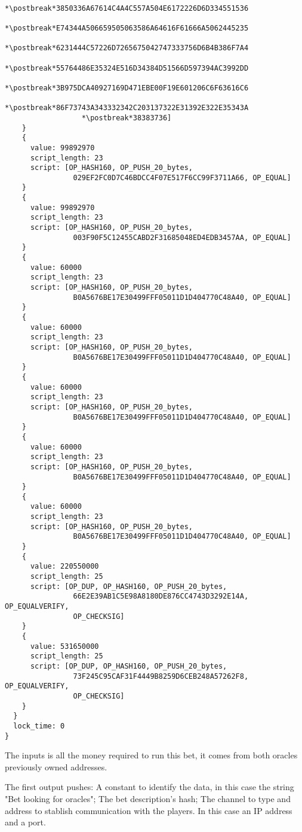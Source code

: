\begin{lstlisting}
                  *\postbreak*3850336A67614C4A4C557A504E6172226D6D334551536
                  *\postbreak*E74344A506659505063586A64616F61666A5062445235
                  *\postbreak*6231444C57226D7265675042747333756D6B4B386F7A4
                  *\postbreak*55764486E35324E516D34384D51566D597394AC3992DD
                  *\postbreak*3B975DCA40927169D471EBE00F19E601206C6F63616C6
                  *\postbreak*86F73743A343332342C203137322E31392E322E35343A
                  *\postbreak*38383736]
    }
    {
      value: 99892970
      script_length: 23
      script: [OP_HASH160, OP_PUSH_20_bytes,
                029EF2FC0D7C46BDCC4F07E517F6CC99F3711A66, OP_EQUAL]
    }
    {
      value: 99892970
      script_length: 23
      script: [OP_HASH160, OP_PUSH_20_bytes,
                003F90F5C12455CABD2F31685048ED4EDB3457AA, OP_EQUAL]
    }
    {
      value: 60000
      script_length: 23
      script: [OP_HASH160, OP_PUSH_20_bytes,
                B0A5676BE17E30499FFF05011D1D404770C48A40, OP_EQUAL]
    }
    {
      value: 60000
      script_length: 23
      script: [OP_HASH160, OP_PUSH_20_bytes,
                B0A5676BE17E30499FFF05011D1D404770C48A40, OP_EQUAL]
    }
    {
      value: 60000
      script_length: 23
      script: [OP_HASH160, OP_PUSH_20_bytes,
                B0A5676BE17E30499FFF05011D1D404770C48A40, OP_EQUAL]
    }
    {
      value: 60000
      script_length: 23
      script: [OP_HASH160, OP_PUSH_20_bytes,
                B0A5676BE17E30499FFF05011D1D404770C48A40, OP_EQUAL]
    }
    {
      value: 60000
      script_length: 23
      script: [OP_HASH160, OP_PUSH_20_bytes,
                B0A5676BE17E30499FFF05011D1D404770C48A40, OP_EQUAL]
    }
    {
      value: 220550000
      script_length: 25
      script: [OP_DUP, OP_HASH160, OP_PUSH_20_bytes,
                66E2E39AB1C5E98A8180DE876CC4743D3292E14A, OP_EQUALVERIFY,
                OP_CHECKSIG]
    }
    {
      value: 531650000
      script_length: 25
      script: [OP_DUP, OP_HASH160, OP_PUSH_20_bytes,
                73F245C95CAF31F4449B8259D6CEB248A57262F8, OP_EQUALVERIFY,
                OP_CHECKSIG]
    }
  }
  lock_time: 0
}
\end{lstlisting}

The inputs is all the money required to run this bet, it comes from both
  oracles previously owned addresses.

The first output pushes: A constant to identify the data, in this case the
  string "Bet looking for oracles"; The bet description's hash; The channel
  to type and address to stablish communication with the players. In this
  case an IP address and a port.

